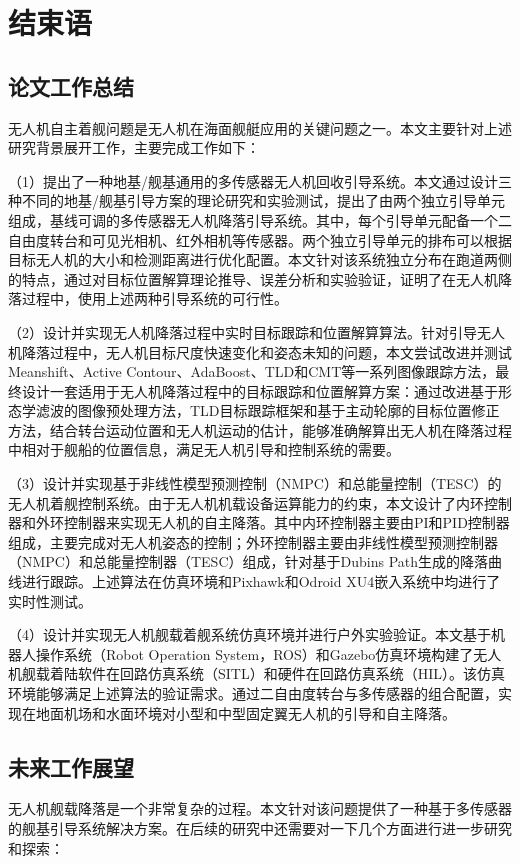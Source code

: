 \chapter{结束语}

\section{论文工作总结}
无人机自主着舰问题是无人机在海面舰艇应用的关键问题之一。本文主要针对上述研究背景展开工作，主要完成工作如下：

（1）提出了一种地基/舰基通用的多传感器无人机回收引导系统。本文通过设计三种不同的地基/舰基引导方案的理论研究和实验测试，提出了由两个独立引导单元组成，基线可调的多传感器无人机降落引导系统。其中，每个引导单元配备一个二自由度转台和可见光相机、红外相机等传感器。两个独立引导单元的排布可以根据目标无人机的大小和检测距离进行优化配置。本文针对该系统独立分布在跑道两侧的特点，通过对目标位置解算理论推导、误差分析和实验验证，证明了在无人机降落过程中，使用上述两种引导系统的可行性。

（2）设计并实现无人机降落过程中实时目标跟踪和位置解算算法。针对引导无人机降落过程中，无人机目标尺度快速变化和姿态未知的问题，本文尝试改进并测试Meanshift、Active Contour、AdaBoost、TLD和CMT等一系列图像跟踪方法，最终设计一套适用于无人机降落过程中的目标跟踪和位置解算方案：通过改进基于形态学滤波的图像预处理方法，TLD目标跟踪框架和基于主动轮廓的目标位置修正方法，结合转台运动位置和无人机运动的估计，能够准确解算出无人机在降落过程中相对于舰船的位置信息，满足无人机引导和控制系统的需要。

（3）设计并实现基于非线性模型预测控制（NMPC）和总能量控制（TESC）的无人机着舰控制系统。由于无人机机载设备运算能力的约束，本文设计了内环控制器和外环控制器来实现无人机的自主降落。其中内环控制器主要由PI和PID控制器组成，主要完成对无人机姿态的控制；外环控制器主要由非线性模型预测控制器（NMPC）和总能量控制器（TESC）组成，针对基于Dubins Path生成的降落曲线进行跟踪。上述算法在仿真环境和Pixhawk和Odroid XU4嵌入系统中均进行了实时性测试。

（4）设计并实现无人机舰载着舰系统仿真环境并进行户外实验验证。本文基于机器人操作系统（Robot Operation System，ROS）和Gazebo仿真环境构建了无人机舰载着陆软件在回路仿真系统（SITL）和硬件在回路仿真系统（HIL）。该仿真环境能够满足上述算法的验证需求。通过二自由度转台与多传感器的组合配置，实现在地面机场和水面环境对小型和中型固定翼无人机的引导和自主降落。

\section{未来工作展望}
无人机舰载降落是一个非常复杂的过程。本文针对该问题提供了一种基于多传感器的舰基引导系统解决方案。在后续的研究中还需要对一下几个方面进行进一步研究和探索：

